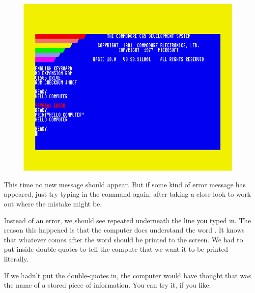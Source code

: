 \setlength{\intextsep}{0pt}%
  \begin{figure}
    \includegraphics[width=\linewidth]{images/print-hello-computer.png}
  \end{figure}

  This time no new  message should appear. But if some kind
  of error message has appeared, just try typing in the command again, after
  taking a close look to work out where the mistake might be.

  Instead of an error, we should see  repeated underneath
  the line you typed in.  The reason this happened is that the computer
  does understand the word .  It knows that whatever comes after
  the word  should be printed to the screen.  We had to put  inside double-quotes to tell the compute that we want it to be
  printed literally.

  If we hadn't put the double-quotes in, the computer would have thought
  that  was the name of a stored piece of information.
  You can try it, if you like.

